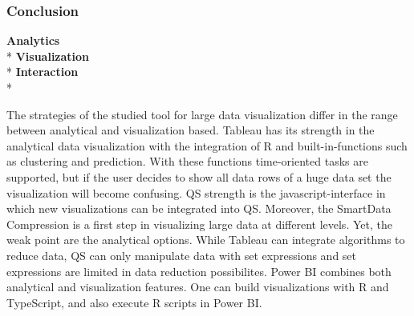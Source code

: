 \subsubsection{Conclusion}
\textbf{Analytics}\\*
\textbf{Visualization}\\*
\textbf{Interaction}\\*

The strategies of the studied tool for large data visualization differ in the range between analytical and visualization based. 
Tableau has its strength in the analytical data visualization with the integration of R and built-in-functions such as clustering and prediction. With these functions time-oriented tasks are supported, but if the user decides to show all data rows of a huge data set the visualization will become confusing. 
QS strength is the javascript-interface in which new visualizations can be integrated into QS. Moreover, the SmartData Compression is a first step in visualizing large data at different levels. 
Yet, the weak point are the analytical options. While Tableau can integrate algorithms to reduce data, QS can only manipulate data with set expressions and set expressions are limited in data reduction possibilites.
Power BI combines both analytical and visualization features. One can build visualizations with R and TypeScript, and also execute R scripts in Power BI.
